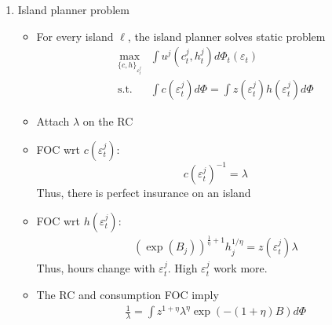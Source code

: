 \documentclass{article}
\begin{document}
\begin{enumerate}
\item Island planner problem

\begin{itemize}
\item For every island $\ell$, the island planner solves static problem
\begin{align*}
\max_{\{c, h\}_{\varepsilon^j_t}} & \int u^j(c_t^j, h_t^j) d \Phi_t (\varepsilon_t)\\
\text{s.t. } & \int c(\varepsilon_t^j) d \Phi = \int z(\varepsilon_t^j) h (\varepsilon_t^j) d \Phi 
\end{align*}
\item Attach $\lambda$ on the RC
\item FOC  wrt $c(\varepsilon_t^j)$:
$$
c(\varepsilon_t^j)^{-1} = \lambda 
$$
Thus, there is perfect insurance on an island
\item FOC wrt $h(\varepsilon_t^j)$:
\begin{align*}
(\exp(B_j))^{\frac{1}{\eta} + 1} h_j^{1/\eta} = z(\varepsilon_t^j) \lambda
\end{align*}
Thus, hours change with $\varepsilon_t^j$. High $\varepsilon_t^j$ work more.
\item The RC and consumption FOC imply
\begin{align*}
\frac{1}{\lambda} = \int z^{1 + \eta} \lambda^\eta \exp(-(1+\eta)B) d \Phi
\end{align*}

\end{itemize}

\end{enumerate}
\end{document}
